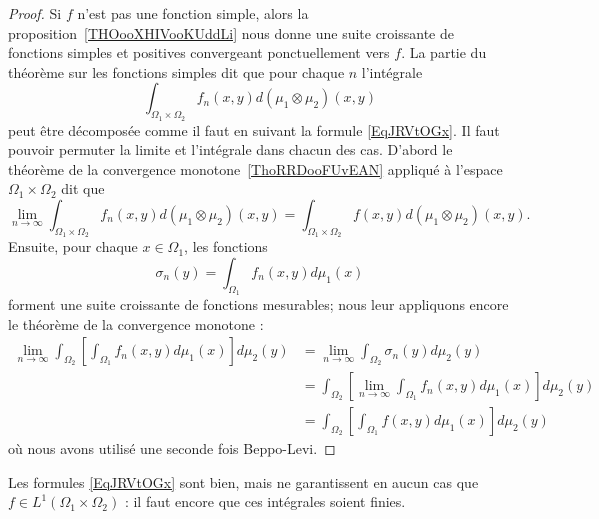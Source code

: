 \begin{proof}
	Si \( f\) n'est pas une fonction simple, alors la proposition~\ref{THOooXHIVooKUddLi} nous donne une suite croissante de fonctions simples et positives convergeant ponctuellement vers \( f\). La partie du théorème sur les fonctions simples dit que pour chaque \( n\) l'intégrale
	\begin{equation}
		\int_{\Omega_1\times \Omega_2}f_n(x,y)d(\mu_1\otimes\mu_2)(x,y)
	\end{equation}
	peut être décomposée comme il faut en suivant la formule \eqref{EqJRVtOGx}. Il faut pouvoir permuter la limite et l'intégrale dans chacun des cas. D'abord le théorème de la convergence monotone~\ref{ThoRRDooFUvEAN} appliqué à l'espace \( \Omega_1\times \Omega_2\) dit que
	\begin{equation}
		\lim_{n\to \infty} \int_{\Omega_1\times \Omega_2}f_n(x,y)d(\mu_1\otimes \mu_2)(x,y)= \int_{\Omega_1\times \Omega_2}f(x,y)d(\mu_1\otimes \mu_2)(x,y).
	\end{equation}
	Ensuite, pour chaque \( x\in\Omega_1\), les fonctions
	\begin{equation}
		\sigma_n(y)=\int_{\Omega_1}f_n(x,y)d\mu_1(x)
	\end{equation}
	forment une suite croissante de fonctions mesurables; nous leur appliquons encore le théorème de la convergence monotone :
	\begin{subequations}
		\begin{align}
			\lim_{n\to \infty} \int_{\Omega_2}\left[ \int_{\Omega_1}f_n(x,y)d\mu_1(x) \right]d\mu_2(y) & =\lim_{n\to \infty} \int_{\Omega_2}\sigma_n(y)d\mu_2(y)                                   \\
			                                                                                           & =\int_{\Omega_2}\left[\lim_{n\to \infty} \int_{\Omega_1}f_n(x,y)d\mu_1(x)\right]d\mu_2(y) \\
			                                                                                           & =\int_{\Omega_2}\left[ \int_{\Omega_1}f(x,y)d\mu_1(x) \right]d\mu_2(y)
		\end{align}
	\end{subequations}
	où nous avons utilisé une seconde fois Beppo-Levi.
\end{proof}

\begin{remark}
	Les formules \eqref{EqJRVtOGx} sont bien, mais ne garantissent en aucun cas que \( f\in L^1(\Omega_1\times \Omega_2)\) : il faut encore que ces intégrales soient finies.
\end{remark}


